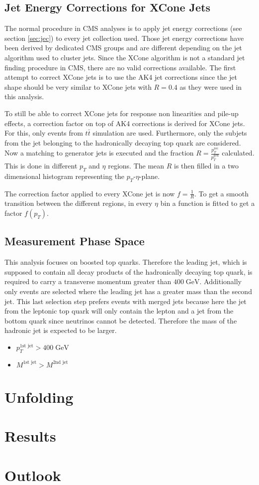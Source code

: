 \subsection{Jet Energy Corrections for XCone Jets} 
	The normal procedure in CMS analyses is to apply jet energy corrections (see section \ref{sec:jec}) to every jet collection used. Those jet energy corrections have been derived by dedicated CMS groups and are different depending on the jet algorithm used to cluster jets. Since the XCone algorithm is not a standard jet finding procedure in CMS, there are no valid corrections available. The first attempt to correct XCone jets is to use the AK4 jet corrections since the jet shape should be very similar to XCone jets with $R=0.4$ as they were used in this analysis.
	
	To still be able to correct XCone jets for response non linearities and pile-up effects, a correction factor on top of AK4 corrections is derived for XCone jets. For this, only events from $t\bar{t}$ simulation are used. Furthermore, only the subjets from the jet belonging to the hadronically decaying top quark are considered. Now a matching to generator jets is executed and the fraction $R=\frac{p_T^{\text{rec}}}{p_T^{\text{gen}}}$ calculated. This is done in different $p_T$ and $\eta$ regions. The mean $R$ is then filled in a two dimensional histogram representing the $p_T$-$\eta$-plane.
	
	The correction factor applied to every XCone jet is now $f = \frac{1}{R}$. To get a smooth transition between the different regions, in every $\eta$ bin a function is fitted to get a factor $f(p_T)$.
\subsection{Measurement Phase Space}
\label{sec:FinalSel}
	This analysis focuses on boosted top quarks. Therefore the leading jet, which is supposed to contain all decay products of the hadronically decaying top quark, is required to carry a transverse momentum greater than $400\;\text{GeV}$. Additionally only events are selected where the leading jet has a greater mass than the second jet. This last selection step prefers events with merged jets because here the jet from the leptonic top quark will only contain the lepton and a jet from the bottom quark since neutrinos cannot be detected. Therefore the mass of the hadronic jet is expected to be larger.
	\begin{itemize}
	\item $p_T^{\text{1st jet}} > 400\;\text{GeV}$ 
	\item $M^{\text{1st jet}} > M^{\text{2nd jet}}$
	\end{itemize}

\section{Unfolding}
\section{Results}
\section{Outlook}

\label{sec:results}